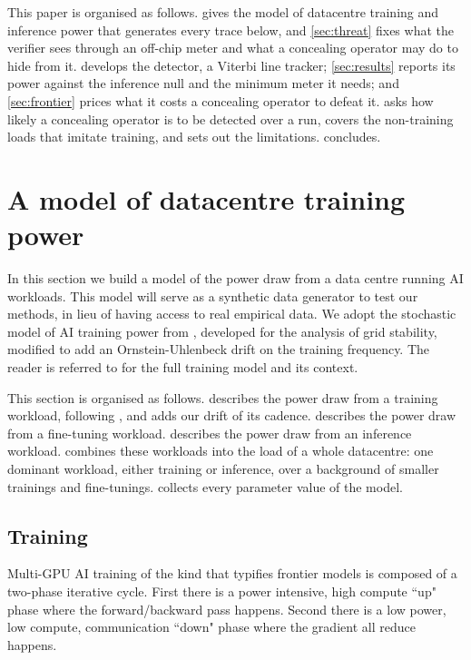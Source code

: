 \documentclass{article}
\begin{document}
This paper is organised as follows.  gives the model of
datacentre training and inference power that generates every trace below, and
\cref{sec:threat} fixes what the verifier sees through an off-chip meter and
what a concealing operator may do to hide from it.  develops the
detector, a Viterbi line tracker; \cref{sec:results} reports its power against
the inference null and the minimum meter it needs; and \cref{sec:frontier}
prices what it costs a concealing operator to defeat it. 
asks how likely a concealing operator is to be detected over a run, covers the
non-training loads that imitate training, and sets out the limitations.
 concludes.


\section{A model of datacentre training power}
\label{sec:scenario}
In this section we build a model of the power draw from a data centre running AI workloads. This model will serve as a synthetic data generator to test our methods, in lieu of having access to real empirical data. We adopt the stochastic model of AI training power from \citet{ko2025widearea}, developed for the analysis of grid stability, modified to add an Ornstein-Uhlenbeck drift on the training frequency. The reader is referred to \citet{ko2025widearea} for the full training model and its context.

This section is organised as follows.  describes the power draw from a
training workload, following \citet{ko2025widearea}, and adds our drift of its cadence.
 describes the power draw from a fine-tuning workload.  describes the power draw from an inference workload.  combines these workloads into the load of a whole
datacentre: one dominant workload, either training or inference, over a
background of smaller trainings and fine-tunings.  collects
every parameter value of the model. 

\subsection{Training}
\label{subsec:ko}

Multi-GPU AI training of the kind that typifies frontier models is composed of a two-phase iterative cycle. First there is a power intensive, high compute ``up" phase where the forward/backward pass happens. Second there is a low power, low compute, communication ``down" phase where the gradient all reduce happens. 
\end{document}
